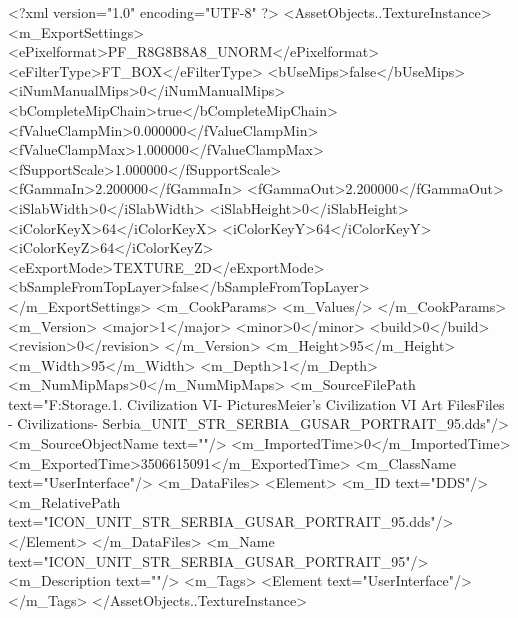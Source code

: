 <?xml version="1.0" encoding="UTF-8" ?>
<AssetObjects..TextureInstance>
	<m_ExportSettings>
		<ePixelformat>PF_R8G8B8A8_UNORM</ePixelformat>
		<eFilterType>FT_BOX</eFilterType>
		<bUseMips>false</bUseMips>
		<iNumManualMips>0</iNumManualMips>
		<bCompleteMipChain>true</bCompleteMipChain>
		<fValueClampMin>0.000000</fValueClampMin>
		<fValueClampMax>1.000000</fValueClampMax>
		<fSupportScale>1.000000</fSupportScale>
		<fGammaIn>2.200000</fGammaIn>
		<fGammaOut>2.200000</fGammaOut>
		<iSlabWidth>0</iSlabWidth>
		<iSlabHeight>0</iSlabHeight>
		<iColorKeyX>64</iColorKeyX>
		<iColorKeyY>64</iColorKeyY>
		<iColorKeyZ>64</iColorKeyZ>
		<eExportMode>TEXTURE_2D</eExportMode>
		<bSampleFromTopLayer>false</bSampleFromTopLayer>
	</m_ExportSettings>
	<m_CookParams>
		<m_Values/>
	</m_CookParams>
	<m_Version>
		<major>1</major>
		<minor>0</minor>
		<build>0</build>
		<revision>0</revision>
	</m_Version>
	<m_Height>95</m_Height>
	<m_Width>95</m_Width>
	<m_Depth>1</m_Depth>
	<m_NumMipMaps>0</m_NumMipMaps>
	<m_SourceFilePath text="F:\Mod Storage\2.1. Civilization VI\Mods\Archive - Pictures\Sid Meier's Civilization VI Art Files\Art Files - Civilizations\Civilization - Serbia\ICON_UNIT_STR_SERBIA_GUSAR_PORTRAIT_95.dds"/>
	<m_SourceObjectName text=""/>
	<m_ImportedTime>0</m_ImportedTime>
	<m_ExportedTime>3506615091</m_ExportedTime>
	<m_ClassName text="UserInterface"/>
	<m_DataFiles>
		<Element>
			<m_ID text="DDS"/>
			<m_RelativePath text="ICON_UNIT_STR_SERBIA_GUSAR_PORTRAIT_95.dds"/>
		</Element>
	</m_DataFiles>
	<m_Name text="ICON_UNIT_STR_SERBIA_GUSAR_PORTRAIT_95"/>
	<m_Description text=""/>
	<m_Tags>
		<Element text="UserInterface"/>
	</m_Tags>
</AssetObjects..TextureInstance>

